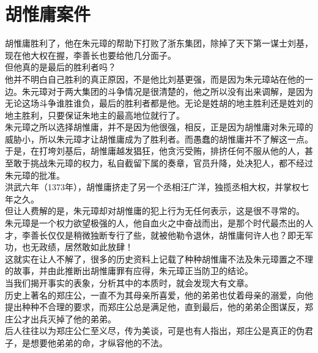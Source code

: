 \section{胡惟庸案件}
\ifnum{}
	\begin{multicols}{\theparacolNo}
\fi
胡惟庸胜利了，他在朱元璋的帮助下打败了浙东集团，除掉了天下第一谋士刘基，现在他大权在握，李善长也要给他几分面子。\\

但他真的是最后的胜利者吗？\\

他并不明白自己胜利的真正原因，不是他比刘基更强，而是因为朱元璋站在他的一边。朱元璋对于两大集团的斗争情况是很清楚的，他之所以没有出来调解，是因为无论这场斗争谁胜谁负，最后的胜利者都是他。无论是姓胡的地主胜利还是姓刘的地主胜利，只要保证朱地主的最高地位就行了。\\

朱元璋之所以选择胡惟庸，并不是因为他很强，相反，正是因为胡惟庸对朱元璋的威胁小，所以朱元璋才让胡惟庸成为了胜利者。而愚蠢的胡惟庸并不了解这一点。\\

于是，在打垮刘基后，胡惟庸越发猖狂，他贪污受贿，排挤任何不服从他的人，甚至敢于挑战朱元璋的权力，私自截留下属的奏章，官员升降，处决犯人，都不经过朱元璋的批准。\\

洪武六年（1373年），胡惟庸挤走了另一个丞相汪广洋，独揽丞相大权，并掌权七年之久。\\

但让人费解的是，朱元璋却对胡惟庸的犯上行为无任何表示，这是很不寻常的。\\

朱元璋是一个权力欲望极强的人，他自血火之中奋战而出，是那个时代最杰出的人才，李善长仅仅是稍微独断专行了些，就被他勒令退休，胡惟庸何许人也？即无军功，也无政绩，居然敢如此放肆！\\

这就实在让人不解了，很多的历史资料上记载了种种胡惟庸不法及朱元璋置之不理的故事，并由此推断出胡惟庸罪有应得，朱元璋正当防卫的结论。\\

当我们揭开事实的表象，分析其中的本质时，就会发现大有文章。\\

历史上著名的郑庄公，一直不为其母亲所喜爱，他的弟弟也仗着母亲的溺爱，向他提出种种不合理的要求，而郑庄公总是满足他，直到最后，他的弟弟企图谋反，郑庄公才出兵灭掉了他的弟弟。\\

后人往往以为郑庄公仁至义尽，传为美谈，可是也有人指出，郑庄公是真正的伪君子，是想要他弟弟的命，才纵容他的不法。\\


\end{multicols}
